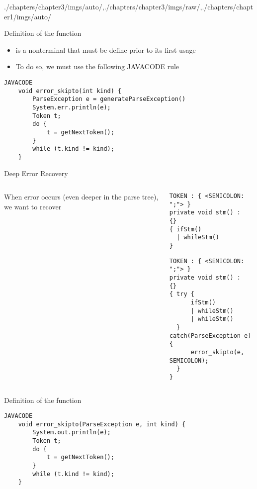 \begin{graphicspathcontext}{{./chapters/chapter3/imgs/auto/},{./chapters/chapter3/imgs/raw/},{./chapters/chapter1/imgs/auto/}}
\begin{bibunit}[apalike]
\begin{frame}[fragile]{Definition of the function }
	\begin{itemize}
	\item {} is a nonterminal that must be define prior to its first usage
	\item To do so, we must use the following JAVACODE rule
	\end{itemize}
	\begin{lstlisting}[style=lststyle-java]
	JAVACODE
	void error_skipto(int kind) {
	    ParseException e = generateParseException()
	    System.err.println(e);
	    Token t;
	    do {
	        t = getNextToken();
	    }
	    while (t.kind != kind);
	}
	\end{lstlisting}
\end{frame}

\begin{frame}[t,fragile]{Deep Error Recovery}
	\begin{columns}
		\begin{column}{.3\linewidth}
			When error occurs (even deeper in the parse tree), we want to recover
		\end{column}
		\begin{column}{.7\linewidth}
			\vspace{-.5cm}
			\begin{lstlisting}[style=lststyle-java]
TOKEN : { <SEMICOLON: ";"> }
private void stm() :
{}
{ ifStm()
  | whileStm()
}
			\end{lstlisting}
			\mbox{}\hfill{}\hfill\mbox{}
			\begin{lstlisting}[style=lststyle-java]
TOKEN : { <SEMICOLON: ";"> }
private void stm() :
{}
{ try {
      ifStm()
      | whileStm()
      | whileStm()
  } catch(ParseException e) {
      error_skipto(e, SEMICOLON);
  }
}
			\end{lstlisting}
		\end{column}
	\end{columns}
\end{frame}

\begin{frame}[fragile]{Definition of the function }
	\begin{lstlisting}[style=lststyle-java]
	JAVACODE
	void error_skipto(ParseException e, int kind) {
	    System.out.println(e);
	    Token t;
	    do {
	        t = getNextToken();
	    }
	    while (t.kind != kind);
	}
	\end{lstlisting}
\end{frame}


\end{bibunit}
\end{graphicspathcontext}
